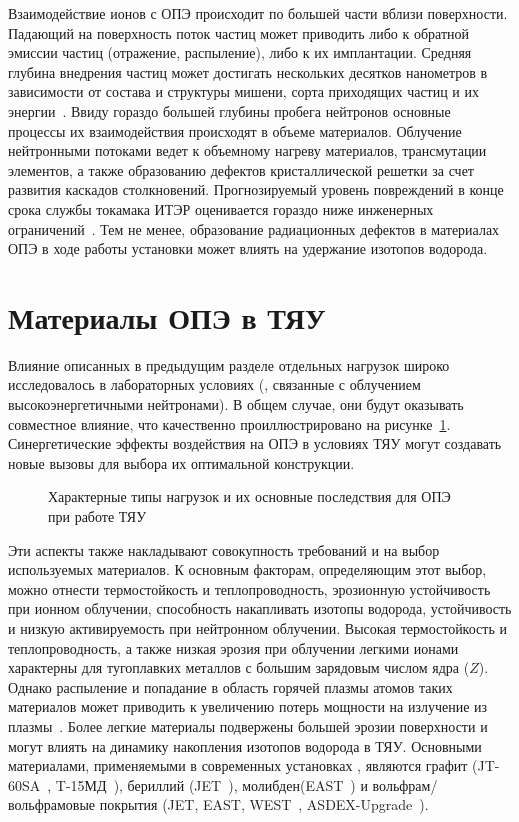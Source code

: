 Взаимодействие ионов с ОПЭ происходит по большей части вблизи поверхности. Падающий на поверхность поток частиц может приводить либо к обратной эмиссии частиц (отражение, распыление), либо к их имплантации. Средняя глубина внедрения частиц может достигать нескольких десятков нанометров в зависимости от состава и структуры мишени, сорта приходящих частиц и их энергии~\cite{eckstein2010penetration}. Ввиду гораздо большей глубины пробега нейтронов основные процессы их взаимодействия происходят в объеме материалов. Облучение нейтронными потоками ведет к объемному нагреву материалов, трансмутации элементов, а также образованию дефектов кристаллической решетки за счет развития каскадов столкновений. Прогнозируемый уровень повреждений в конце срока службы токамака ИТЭР оценивается гораздо ниже инженерных ограничений~\cite{Villari2013}. Тем не менее, образование радиационных дефектов в материалах ОПЭ в ходе работы установки может влиять на удержание изотопов водорода.

\section{Материалы ОПЭ в ТЯУ}\label{sec:ch1/sec2}

Влияние описанных в предыдущим разделе отдельных  нагрузок широко исследовалось в лабораторных условиях (, связанные с облучением высокоэнергетичными нейтронами). В общем случае, они будут оказывать совместное влияние, что качественно проиллюстрировано на рисунке~\cref{fig:ch1/synergetic_diagram}. Синергетические эффекты воздействия на ОПЭ в условиях ТЯУ могут создавать новые вызовы для выбора их оптимальной конструкции.
\begin{figure}[ht]
    \caption{Характерные типы нагрузок и их основные последствия для ОПЭ при работе ТЯУ~\cite{Linke2019}}\label{fig:ch1/synergetic_diagram}
\end{figure}
Эти аспекты также накладывают совокупность требований и на выбор используемых материалов. К основным факторам, определяющим этот выбор, можно отнести термостойкость и теплопроводность, эрозионную устойчивость при ионном облучении, способность накапливать изотопы водорода, устойчивость и низкую активируемость при нейтронном облучении. Высокая термостойкость и теплопроводность, а также низкая эрозия при облучении легкими ионами характерны для тугоплавких металлов с большим зарядовым числом ядра ($Z$). Однако распыление и попадание в область горячей плазмы атомов таких материалов может приводить к увеличению потерь мощности на излучение из плазмы~\cite{Ptterich2019}. Более легкие материалы подвержены большей эрозии поверхности и могут влиять на динамику накопления изотопов водорода в ТЯУ. Основными материалами, применяемыми в современных установках , являются графит (JT-60SA~\cite{Shirai2024}, T-15МД~\cite{Velikhov2024}), бериллий (JET~\cite{Maggi2024,Kappatou2025}), молибден(EAST~\cite{Gong2024}) и вольфрам/вольфрамовые покрытия (JET, EAST, WEST~\cite{Shi2025}, ASDEX-Upgrade~\cite{Rohde2009}). 

